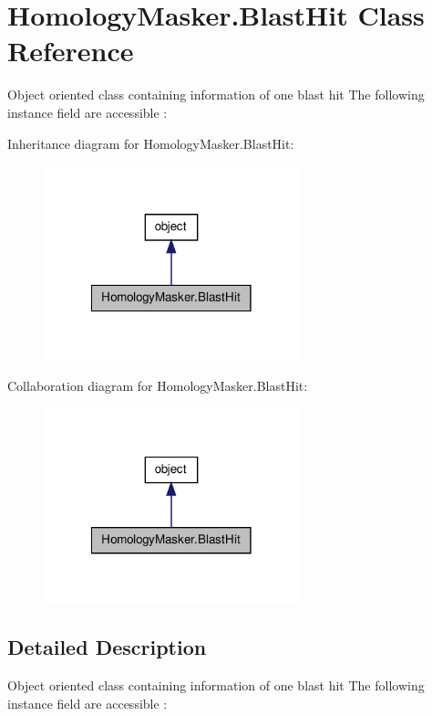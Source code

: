 \hypertarget{classHomologyMasker_1_1BlastHit}{\section{Homology\-Masker.\-Blast\-Hit Class Reference}
\label{classHomologyMasker_1_1BlastHit}
}


Object oriented class containing information of one blast hit The following instance field are accessible \-:  




Inheritance diagram for Homology\-Masker.\-Blast\-Hit\-:
\nopagebreak
\begin{figure}[H]
\begin{center}
\leavevmode
\includegraphics[width=210pt]{classHomologyMasker_1_1BlastHit__inherit__graph}
\end{center}
\end{figure}


Collaboration diagram for Homology\-Masker.\-Blast\-Hit\-:
\nopagebreak
\begin{figure}[H]
\begin{center}
\leavevmode
\includegraphics[width=210pt]{classHomologyMasker_1_1BlastHit__coll__graph}
\end{center}
\end{figure}


\subsection{Detailed Description}
Object oriented class containing information of one blast hit The following instance field are accessible \-: 


